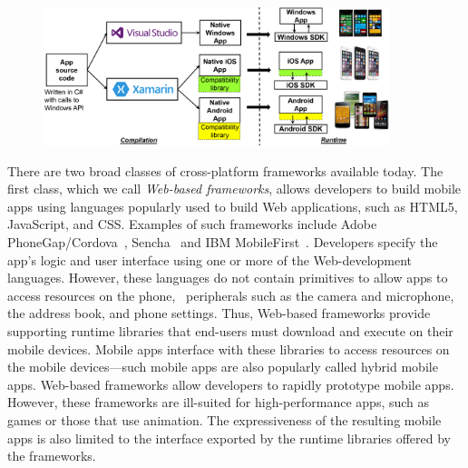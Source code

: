 \begin{figure}[t!]
\centering
\includegraphics[keepaspectratio=true,width=0.9\textwidth]{figures/xptools-overview.png}
\end{figure}

There are two broad classes of cross-platform frameworks available
today.  The first class, which we call \textit{Web-based frameworks},
allows developers to build mobile apps using languages popularly used
to build Web applications, such as HTML5, JavaScript, and
CSS. Examples of such frameworks include Adobe
PhoneGap/Cordova~\cite{phonegap}, Sencha~\cite{sencha} and IBM
MobileFirst~\cite{worklight}.  Developers specify the app's logic and
user interface using one or more of the Web-development languages.
However, these languages do not contain primitives to allow apps to
access resources on the phone, \eg~peripherals such as the camera and
microphone, the address book, and phone settings. Thus, Web-based
frameworks provide supporting runtime libraries that end-users must
download and execute on their mobile devices. Mobile apps interface
with these libraries to access resources on the mobile devices---such
mobile apps are also popularly called hybrid mobile apps.  Web-based
frameworks allow developers to rapidly prototype mobile apps.
However, these frameworks are ill-suited for high-performance apps,
such as games or those that use animation. The expressiveness of the
resulting mobile apps is also limited to the interface exported by the
runtime libraries offered by the frameworks.


